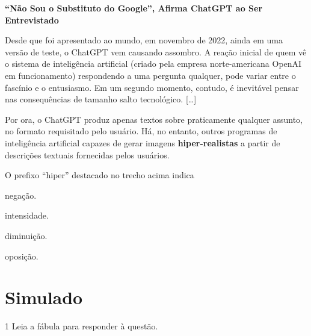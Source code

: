 \begin{myquote}
\textbf{``Não Sou o Substituto do Google'', Afirma ChatGPT ao Ser Entrevistado}

Desde que foi apresentado ao mundo, em novembro de 2022, ainda em uma
versão de teste, o ChatGPT vem causando assombro. A reação inicial de
quem vê o sistema de inteligência artificial (criado pela empresa
norte-americana OpenAI em funcionamento) respondendo a uma pergunta
qualquer, pode variar entre o fascínio e o entusiasmo. Em um segundo
momento, contudo, é inevitável pensar nas consequências de tamanho salto
tecnológico. {[}\ldots{}{]}

Por ora, o ChatGPT produz apenas textos sobre praticamente qualquer
assunto, no formato requisitado pelo usuário. Há, no entanto, outros
programas de inteligência artificial capazes de gerar imagens
\textbf{hiper-realistas} a partir de descrições textuais fornecidas pelos
usuários.

\end{myquote}

O prefixo ``hiper'' destacado no trecho acima indica

\begin{escolha}
  \item negação.

  \item intensidade.

  \item diminuição.

  \item oposição.
\end{escolha}
\pagebreak

\chapter[Simulado 2]{Simulado}

\num{1} Leia a fábula para responder à questão.


